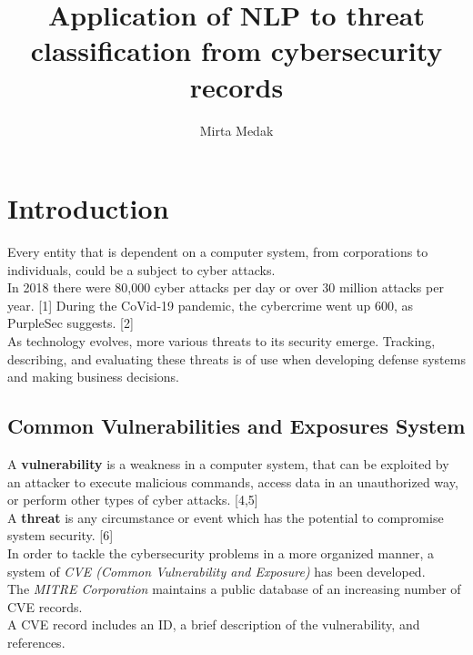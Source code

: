\documentclass[times, utf8, zavrsni, english]{fer}
\begin{document}

\title{Application of NLP to threat classification from cybersecurity records}

\author{Mirta Medak}

\maketitle

\izvornik

\zahvala{}

\tableofcontents

\chapter{Introduction}
Every entity that is dependent on a computer system, from corporations to individuals, could be a subject to cyber attacks. \\
In 2018 there were 80,000 cyber attacks per day or over 30 million attacks per year. [1] During the CoVid-19 pandemic, the cybercrime went up 600, as PurpleSec suggests. [2] \\
As technology evolves, more various threats to its security emerge.
Tracking, describing, and evaluating these threats is of use when developing defense systems and making business decisions. \\

\section{Common Vulnerabilities and Exposures System}
A \textbf{vulnerability} is a weakness in a computer system, that can be exploited by an attacker to execute malicious commands, access data in an unauthorized way, or perform other types of cyber attacks. [4,5] \\
A \textbf{threat} is any circumstance or event which has the potential to compromise system security. [6] \\
In order to tackle the cybersecurity problems in a more organized manner, a system of \emph{CVE (Common Vulnerability and Exposure)} has been developed. \\
The \emph{MITRE Corporation} maintains a public database of an increasing number of CVE records. \\
A CVE record includes an ID, a brief description of the vulnerability, and references.
\end{document}
